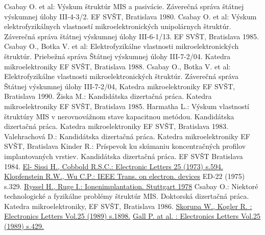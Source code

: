 \begin{thebibliography}{}
 Csabay O. et al: Výskum štruktúr MIS a
  pasivácie. Záverečná správa štátnej výskumnej úlohy III-4-3/2. EF
  SVŠT, Bratislava 1980.
 Csabay O. et al: Výskum elektrofyzikálnych
  vlastností mikroelektronických unipolárnych štruktúr. Záverečná
  správa štátnej výskumnej úlohy III-6-1/13. EF SVŠT, Bratislava 1985.
 Csabay O., Botka V. et al: Elektrofyzikálne
  vlastnosti mikroelektronických štruktúr. Priebežná správa Štátnej
  výskumnej úlohy III-7-2/04. Katedra mikroelektroniky EF SVŠT,
  Bratislava 1988.
 Csabay O., Botka V. et al: Elektrofyzikálne
  vlastnosti mikroelektronických štruktúr. Záverečná správa Štátnej
  výskumnej úlohy III-7-2/04, Katedra mikroelektroniky EF SVŠT,
  Bratislava 1990.
 Žiska M.: Kandidátska dizertačná práca. Katedra
  mikroelektroniky EF SVŠT, Bratislava 1985.
 Harmatha L.: Výskum vlastností štruktúry MIS v
  nerovnovážnom stave kapacitnou metódou. Kandidátska dizertačná
  práca. Katedra mikroelektroniky EF SVŠT, Bratislava 1983.
 Valehrachová D.: Kandidátska dizertačná
  práca. Katedra mikroelektroniky EF SVŠT, Bratislava
 Kinder R.: Príspevok ku skúmaniu koncentračných
  profilov implantovaných vrstiev. Kandidátska dizertačná práca. EF
  SVŠT Bratislava 1984.
  \href {http://ieeexplore.ieee.org/xpl/articleDetails.jsp?arnumber=4236397&filter\%3DAND\%28p_IS_Number\%3A4236383\%29}
    {El- Sissi H., Cobbold R.S.C.: Electronic Letters 25 (1973) s.594.}
  \href {http://ieeexplore.ieee.org/xpl/freeabs_all.jsp?arnumber=1477966}
        {Klopfenstein R.W., Wu C.P.: IEEE Trans. on electron. devices}
        ED-22 (1975) s.329.
  \href {http://www.springer.com/us/book/9783519032069}
  {Ryssel H., Ruge I.: Ionenimplantation. Stuttgart 1978}
 Csabay O.: Niektoré technologické a fyzikálne
  problémy štruktúr MIS. Doktorská dizertačná práca. Katedra
  mikroelektroniky, EF SVŠT, Bratislava 1986.
  \href {http://ieeexplore.ieee.org/xpl/articleDetails.jsp?arnumber=59491&filter\%3DAND\%28p_IS_Number\%3A2166\%29\%26pageNumber\%3D2}
    {Skorupa W., Kogler R. : Electronics Letters Vol.25 (1989) s.1898.}
  \href {http://ieeexplore.ieee.org/xpl/login.jsp?tp=&arnumber=18492&url=http\%3A\%2F\%2Fieeexplore.ieee.org\%2Fxpls\%2Fabs_all.jsp\%3Farnumber\%3D18492}
    {Gall P. at al. : Electronics Letters Vol.25 (1989) s.429.}
\end{thebibliography}
